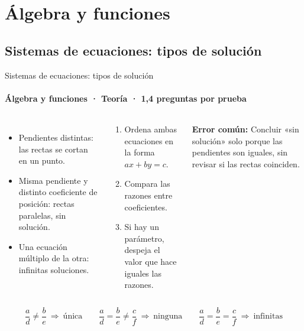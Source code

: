 \documentclass[aspectratio=169,11pt]{beamer}
\newlength{\ajustealto}
\newenvironment{ajustar}[1][0.74\textheight]
  {\setlength{\ajustealto}{#1}\begin{lrbox}{\ajustecaja}\begin{minipage}{\textwidth}}
  {\end{minipage}\end{lrbox}%
   \ifdim\dimexpr\ht\ajustecaja+\dp\ajustecaja\relax>\ajustealto
     \resizebox*{!}{\ajustealto}{\usebox{\ajustecaja}}\else\usebox{\ajustecaja}\fi}
\begin{document}
\section{Álgebra y funciones}

\subsection{Sistemas de ecuaciones: tipos de solución}

\begin{frame}{Sistemas de ecuaciones: tipos de solución}
\label{tema-m2-sistemas}
\framesubtitle{Álgebra y funciones · Teoría · 1,4 preguntas por prueba}
\begin{ajustar}
\begin{columns}[T,onlytextwidth]
\begin{itemize}\footnotesize
\item Pendientes distintas: las rectas se cortan en un punto.
\item Misma pendiente y distinto coeficiente de posición: rectas paralelas, sin solución.
\item Una ecuación múltiplo de la otra: infinitas soluciones.
\end{itemize}
\begin{cajaregla}\scriptsize \begin{enumerate}\item Ordena ambas ecuaciones en la forma $ax+by=c$.\item Compara las razones entre coeficientes.\item Si hay un parámetro, despeja el valor que hace iguales las razones.\end{enumerate}\end{cajaregla}
\begin{notagris}\scriptsize \textbf{Error común:} Concluir «sin solución» solo porque las pendientes son iguales, sin revisar si las rectas coinciden.\end{notagris}
\end{columns}
\begin{cajaclave}[Criterio]\footnotesize
\[\frac{a}{d}\neq\frac{b}{e}\ \Rightarrow\ \text{única} \quad\quad \frac{a}{d}=\frac{b}{e}\neq\frac{c}{f}\ \Rightarrow\ \text{ninguna} \quad\quad \frac{a}{d}=\frac{b}{e}=\frac{c}{f}\ \Rightarrow\ \text{infinitas}\]
\end{cajaclave}
\end{ajustar}
\end{frame}
\end{document}
